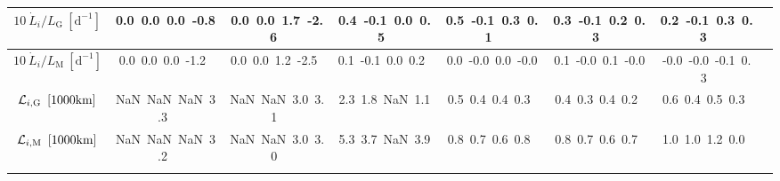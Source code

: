 \begin{table}[H]
{\begin{centering}
\begin{tabular}{|c|c|c|c|c|c|c|c|}
\hline
$10\ \dot{L}_{i}/L_{\mathrm{G}}\ \left[\mathrm{d^{-1}}\right]$ & \textcolor{C1}{0.0}\ \textcolor{C2}{0.0}\ \textcolor{C3}{0.0}\ \textcolor{C4}{-0.8}\  & \textcolor{C1}{0.0}\ \textcolor{C2}{0.0}\ \textcolor{C3}{1.7}\ \textcolor{C4}{-2.6}\  & \textcolor{C1}{0.4}\ \textcolor{C2}{-0.1}\ \textcolor{C3}{0.0}\ \textcolor{C4}{0.5}\  & \textcolor{C1}{0.5}\ \textcolor{C2}{-0.1}\ \textcolor{C3}{0.3}\ \textcolor{C4}{0.1}\  & \textcolor{C1}{0.3}\ \textcolor{C2}{-0.1}\ \textcolor{C3}{0.2}\ \textcolor{C4}{0.3}\  & \textcolor{C1}{0.2}\ \textcolor{C2}{-0.1}\ \textcolor{C3}{0.3}\ \textcolor{C4}{0.3}\  \tabularnewline
\hline
$10\ \dot{L}_{i}/L_{\mathrm{M}}\ \left[\mathrm{d^{-1}}\right]$ & \textcolor{C1}{0.0}\ \textcolor{C2}{0.0}\ \textcolor{C3}{0.0}\ \textcolor{C4}{-1.2}\  & \textcolor{C1}{0.0}\ \textcolor{C2}{0.0}\ \textcolor{C3}{1.2}\ \textcolor{C4}{-2.5}\  & \textcolor{C1}{0.1}\ \textcolor{C2}{-0.1}\ \textcolor{C3}{0.0}\ \textcolor{C4}{0.2}\  & \textcolor{C1}{0.0}\ \textcolor{C2}{-0.0}\ \textcolor{C3}{0.0}\ \textcolor{C4}{-0.0}\  & \textcolor{C1}{0.1}\ \textcolor{C2}{-0.0}\ \textcolor{C3}{0.1}\ \textcolor{C4}{-0.0}\  & \textcolor{C1}{-0.0}\ \textcolor{C2}{-0.0}\ \textcolor{C3}{-0.1}\ \textcolor{C4}{0.3}\  \tabularnewline
\hline
${\cal L}_{i,\mathrm{G}}\ \left[1000\mathrm{km}\right]$ & \textcolor{C1}{NaN}\ \textcolor{C2}{NaN}\ \textcolor{C3}{NaN}\ \textcolor{C4}{3.3}\  & \textcolor{C1}{NaN}\ \textcolor{C2}{NaN}\ \textcolor{C3}{3.0}\ \textcolor{C4}{3.1}\  & \textcolor{C1}{2.3}\ \textcolor{C2}{1.8}\ \textcolor{C3}{NaN}\ \textcolor{C4}{1.1}\  & \textcolor{C1}{0.5}\ \textcolor{C2}{0.4}\ \textcolor{C3}{0.4}\ \textcolor{C4}{0.3}\  & \textcolor{C1}{0.4}\ \textcolor{C2}{0.3}\ \textcolor{C3}{0.4}\ \textcolor{C4}{0.2}\  & \textcolor{C1}{0.6}\ \textcolor{C2}{0.4}\ \textcolor{C3}{0.5}\ \textcolor{C4}{0.3}\  \tabularnewline
\hline
${\cal L}_{i,\mathrm{M}}\ \left[1000\mathrm{km}\right]$ & \textcolor{C1}{NaN}\ \textcolor{C2}{NaN}\ \textcolor{C3}{NaN}\ \textcolor{C4}{3.2}\  & \textcolor{C1}{NaN}\ \textcolor{C2}{NaN}\ \textcolor{C3}{3.0}\ \textcolor{C4}{3.0}\  & \textcolor{C1}{5.3}\ \textcolor{C2}{3.7}\ \textcolor{C3}{NaN}\ \textcolor{C4}{3.9}\  & \textcolor{C1}{0.8}\ \textcolor{C2}{0.7}\ \textcolor{C3}{0.6}\ \textcolor{C4}{0.8}\  & \textcolor{C1}{0.8}\ \textcolor{C2}{0.7}\ \textcolor{C3}{0.6}\ \textcolor{C4}{0.7}\  & \textcolor{C1}{1.0}\ \textcolor{C2}{1.0}\ \textcolor{C3}{1.2}\ \textcolor{C4}{0.0}\  \tabularnewline
\hline
 &  &  &  &  &  & \tabularnewline
\hline
\end{tabular}
\par\end{centering} }
\end{table}

